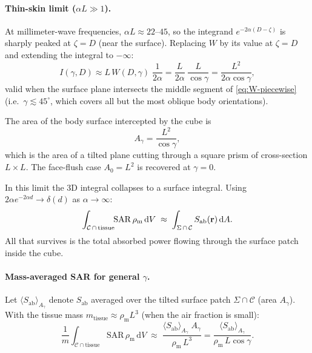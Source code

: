 \documentclass[11pt,a4paper]{article}
\theoremstyle{definition}
\theoremstyle{remark}
\newcommand{\Sab}{S_{\mathrm{ab}}}
\newcommand{\SAR}{\ensuremath{\mathrm{SAR}}}
\newcommand{\rhom}{\rho_{\mathrm{m}}}
\begin{document}
\paragraph{Thin-skin limit ($\alpha L \gg 1$).}
At millimeter-wave frequencies, $\alpha L \approx 22$--$45$, so the integrand
$e^{-2\alpha(D-\zeta)}$ is sharply peaked at $\zeta = D$ (near the surface).
Replacing $W$ by its value at $\zeta = D$ and extending the integral to
$-\infty$:
\begin{equation}\label{eq:thin-skin-cube}
  I(\gamma, D) \approx L\,W(D,\gamma)\;\frac{1}{2\alpha}
  = \frac{L}{2\alpha}\;\frac{L}{\cos\gamma}
  = \frac{L^2}{2\alpha\cos\gamma},
\end{equation}
valid when the surface plane intersects the middle segment of
\cref{eq:W-piecewise} (i.e.\ $\gamma \lesssim 45^\circ$, which covers all but
the most oblique body orientations).

The area of the body surface intercepted by the cube is
\begin{equation}\label{eq:Agamma}
  A_\gamma = \frac{L^2}{\cos\gamma},
\end{equation}
which is the area of a tilted plane cutting through a square prism of
cross-section $L \times L$.  The face-flush case $A_0 = L^2$ is recovered at
$\gamma = 0$.

In this limit the 3D integral collapses to a surface integral.  Using
$2\alpha e^{-2\alpha d} \to \delta(d)$ as $\alpha \to \infty$:
\begin{equation}\label{eq:collapse}
  \int_{\mathcal{C}\,\cap\,\text{tissue}}\!\!\SAR\,\rhom\,\mathrm{d}V
  \;\approx\;
  \int_{\Sigma\,\cap\,\mathcal{C}} \Sab(\vb{r})\,\mathrm{d}A.
\end{equation}
All that survives is the total absorbed power flowing through the surface patch
inside the cube.

\paragraph{Mass-averaged SAR for general $\gamma$.}
Let $\langle\Sab\rangle_{A_\gamma}$ denote $\Sab$ averaged over the tilted
surface patch $\Sigma \cap \mathcal{C}$ (area $A_\gamma$).
With the tissue mass $m_{\text{tissue}} \approx \rhom L^3$ (when the air
fraction is small):
\begin{equation}\label{eq:cube-SAR-gamma}
  \frac{1}{m}\int_{\mathcal{C}\cap\text{tissue}}
    \SAR\,\rhom\,\mathrm{d}V
  \;\approx\;
  \frac{\langle\Sab\rangle_{A_\gamma}\;A_\gamma}{\rhom\,L^3}
  = \frac{\langle\Sab\rangle_{A_\gamma}}{\rhom\,L\cos\gamma}.
\end{equation}
\end{document}
